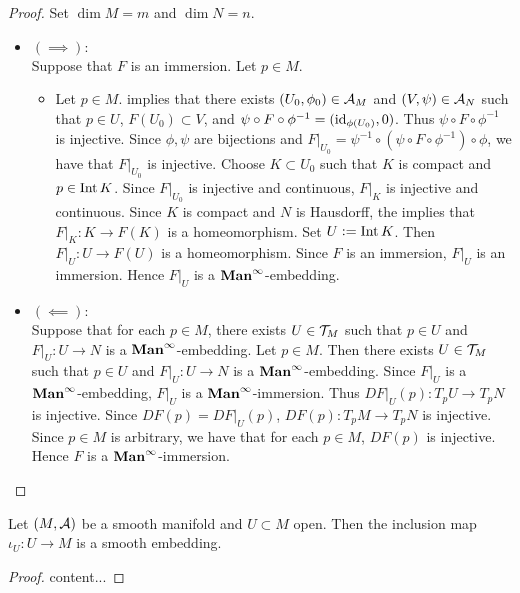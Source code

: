 \documentclass{book}
\begin{document}
	\begin{proof} Set $\dim M = m$ and $\dim N = n$. 
		\begin{itemize}
			\item $(\implies):$ \\
			Suppose that $F$ is an immersion. Let $p \in M$. 
			\begin{itemize}
				\item Let $p \in M$.  implies that there exists $(U_0, \phi_0) \in \mathcal{A}_M$ and $(V, \psi) \in \mathcal{A}_N$ such that $p \in U$, $F(U_0) \subset V$, and $\psi \circ F \circ \phi^{-1} = (\operatorname{id}_{\phi(U_0)}, 0)$. Thus $\psi \circ F \circ \phi^{-1}$ is injective. Since $\phi, \psi$ are bijections and $F|_{U_0} = \psi^{-1} \circ (\psi \circ F \circ \phi^{-1}) \circ \phi$, we have that $F|_{U_0}$ is injective. Choose $K \subset U_0$ such that $K$ is compact and $p \in \operatorname{Int} K$. Since $F|_{U_0}$ is injective and continuous, $F|_{K}$ is injective and continuous. Since $K$ is compact and $N$ is Hausdorff, the  implies that $F|_K: K \rightarrow F(K)$ is a homeomorphism. Set $U \vcentcolon= \operatorname{Int} K$. Then $F|_U:U \rightarrow F(U)$ is a homeomorphism. Since $F$ is an immersion, $F|_U$ is an immersion. Hence $F|_U$ is a $\operatorname*{\text{\textbf{Man}}^{\infty}}$-embedding. 
			\end{itemize}
			\item $(\impliedby):$ \\
			Suppose that for each $p \in M$, there exists $U \in \mathcal{T}_M$ such that $p \in U$ and $F|_U:U \rightarrow N$ is a $\operatorname*{\text{\textbf{Man}}^{\infty}}$-embedding. Let $p \in M$. Then there exists $U \in \mathcal{T}_M$ such that $p \in U$ and $F|_U:U \rightarrow N$ is a $\operatorname*{\text{\textbf{Man}}^{\infty}}$-embedding. Since $F|_U$ is a $\operatorname*{\text{\textbf{Man}}^{\infty}}$-embedding, $F|_U$ is a $\operatorname*{\text{\textbf{Man}}^{\infty}}$-immersion. Thus $DF|_U(p): T_pU \rightarrow T_pN$ is injective. Since $DF(p) = DF|_U(p)$, $DF(p): T_pM \rightarrow T_pN$ is injective. Since $p \in M$ is arbitrary, we have that for each $p \in M$, $DF(p)$ is injective. Hence $F$ is a $\operatorname*{\text{\textbf{Man}}^{\infty}}$-immersion.
		\end{itemize}
	\end{proof}

	\begin{ex} 
		Let $(M, \mathcal{A})$ be a smooth manifold and $U \subset M$ open. Then the inclusion map $\iota_U:U \rightarrow M$ is a smooth embedding. 
	\end{ex}

	\begin{proof}
		content...
	\end{proof}
\end{document}
